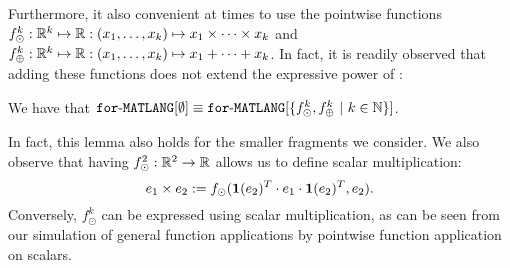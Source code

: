 Furthermore, it also convenient at times to use the pointwise functions
$f_\odot^k:\mathbb{R}^k\mapsto \mathbb{R}:(x_1,\ldots,x_k)\mapsto x_1\times \cdots \times x_k$ and 
$f_\oplus^k:\mathbb{R}^k\mapsto \mathbb{R}:(x_1,\ldots,x_k)\mapsto x_1+\cdots + x_k$. In fact, it is readily observed that adding these functions does not extend the expressive power of \langfor:
\begin{lemma}
\label{lm-prod-sum}
We have that $\texttt{for}\text{-}\texttt{MATLANG}[\emptyset] \equiv \texttt{for}\text{-}\texttt{MATLANG}[\{f_\odot^k,f_\oplus^k \ | \ k\in \mathbb{N}\}]$.
\end{lemma}
In fact, this lemma also holds for the smaller fragments we consider.
%
We also observe that having $f_\odot^2:\mathbb{R}^2\to\mathbb{R}$ allows us to define scalar multiplication:
$$
e_1\times e_2 :=f_{\odot}(\mathbf{1}(e_2)^T\cdot e_1 \cdot \mathbf{1}(e_2)^T, e_2).
$$
Conversely, $f_\odot^k$ can be expressed using scalar multiplication, as can be seen from our simulation of general function applications by pointwise function application on scalars.
